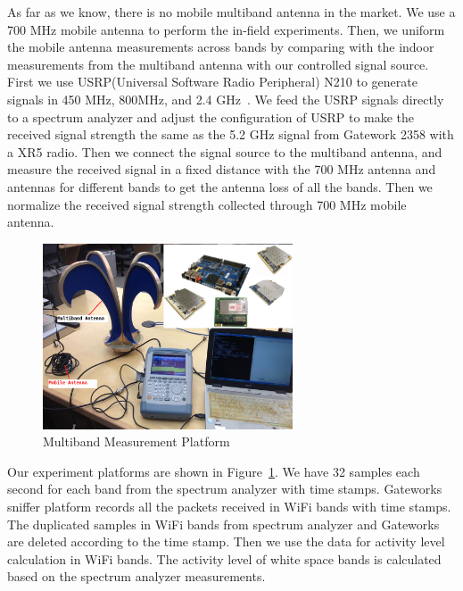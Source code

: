 As far as we know, there is no mobile multiband antenna in the market. We use a 700 MHz
mobile antenna to perform the in-field experiments. 
Then, we uniform the mobile antenna 
measurements across bands by comparing with the indoor measurements from the multiband antenna
with our controlled signal source. First we use USRP(Universal Software Radio Peripheral) 
N210 to generate signals in 450 MHz, 800MHz, and 2.4 GHz~\cite{usrp}. We feed the USRP 
signals directly to a spectrum analyzer and adjust the configuration of USRP to make
the received signal strength the same as the 5.2 GHz signal from Gatework 2358 with 
a XR5 radio. Then we connect the signal source to the multiband antenna, and measure the 
received signal in a fixed distance with the 700 MHz antenna and antennas for different bands
to get the antenna loss of all the bands. Then we normalize the received signal strength 
collected through 700 MHz mobile antenna.

  \begin{figure}
  \centering
  \includegraphics[width=74mm]{figures/equipment}
  \vspace{-0.1in}
  \caption{Multiband Measurement Platform}
  \label{fig:equipment}
  \vspace{-0.15in}
  \end{figure}
  
Our experiment platforms are shown in Figure~\ref{fig:equipment}.
We have 32 samples each second for each band from the spectrum analyzer with time stamps.
Gateworks sniffer platform records all the packets received in WiFi bands with time stamps. 
The duplicated samples in WiFi bands from spectrum analyzer and Gateworks are deleted 
according to the time stamp. Then we use the data for activity level calculation in WiFi bands. 
The activity level of white space bands is calculated based on the spectrum analyzer measurements.  

